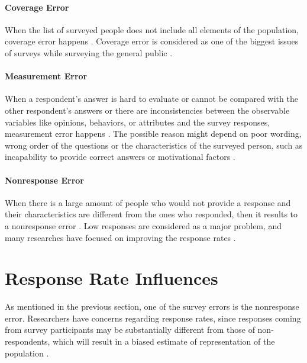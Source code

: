 \paragraph{Coverage Error}
When the list of surveyed people does not include all elements of the population, coverage error happens \citep[page 9]{Dillman2006}. Coverage error is considered as one of the biggest issues of surveys while surveying the general public \citep{Dillman1991}.

\paragraph{Measurement Error}
When a respondent's answer is hard to evaluate or cannot be compared with the other respondent's answers or there are inconsistencies between the observable variables like opinions, behaviors, or attributes and the survey responses, measurement error happens \citetext{\citealp[page 9]{Dillman2006}; \citealp{Dillman1991}}. The possible reason might depend on poor wording, wrong order of the questions or the characteristics of the surveyed person, such as incapability to provide correct answers or motivational factors \citep{Dillman1991}.

\paragraph{Nonresponse Error}
When there is a large amount of people who would not provide a response and their characteristics are different from the ones who responded, then it results to a nonresponse error \citep[page 9]{Dillman2006}. Low responses are considered as a major problem, and many researches have focused on improving the response rates \citep{Dillman1991}.

\section{Response Rate Influences}
\label{sec:2.2:ResRatInf}

As mentioned in the previous section, one of the survey errors is the nonresponse error. Researchers have concerns regarding response rates, since responses coming from survey participants may be substantially different from those of non-respondents, which will result in a biased estimate of representation of the population \citep{Bogen1996}.
\vspace{1cm}

